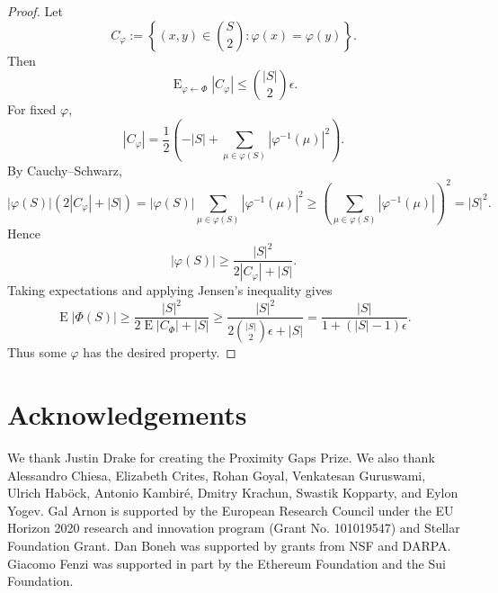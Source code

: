 \documentclass[11pt]{article}
\theoremstyle{plain}
\theoremstyle{definition}
\newcommand{\set}[1]{\left\{#1\right\}}
\newcommand{\abs}[1]{\left|#1\right|}
\DeclareMathOperator*{\E}{E}
\begin{document}
\begin{proof}
Let
\[
  C_\varphi:=\set{(x,y)\in\binom{S}{2}:\varphi(x)=\varphi(y)}.
\]
Then
\[
  \E_{\varphi\leftarrow\Phi}\abs{C_\varphi}\le \binom{\abs{S}}{2}\epsilon.
\]
For fixed $\varphi$,
\[
\abs{C_\varphi}=\frac12\left(-\abs{S}+\sum_{\mu\in\varphi(S)}\abs{\varphi^{-1}(\mu)}^2\right).
\]
By Cauchy--Schwarz,
\[
\abs{\varphi(S)}(2\abs{C_\varphi}+\abs{S})
=\abs{\varphi(S)}\sum_{\mu\in\varphi(S)}\abs{\varphi^{-1}(\mu)}^2
\ge\left(\sum_{\mu\in\varphi(S)}\abs{\varphi^{-1}(\mu)}\right)^2=\abs{S}^2.
\]
Hence
\[
  \abs{\varphi(S)}\ge \frac{\abs{S}^2}{2\abs{C_\varphi}+\abs{S}}.
\]
Taking expectations and applying Jensen's inequality gives
\[
\E\abs{\Phi(S)}\ge
\frac{\abs{S}^2}{2\E\abs{C_\Phi}+\abs{S}}
\ge
\frac{\abs{S}^2}{2\binom{\abs{S}}{2}\epsilon+\abs{S}}
=\frac{\abs{S}}{1+(\abs{S}-1)\epsilon}.
\]
Thus some $\varphi$ has the desired property.
\end{proof}

\section*{Acknowledgements}
We thank Justin Drake for creating the Proximity Gaps Prize. We also thank Alessandro Chiesa, Elizabeth Crites, Rohan Goyal, Venkatesan Guruswami, Ulrich Hab\"ock, Antonio Kambir\'e, Dmitry Krachun, Swastik Kopparty, and Eylon Yogev. Gal Arnon is supported by the European Research Council under the EU Horizon 2020 research and innovation program (Grant No. 101019547) and Stellar Foundation Grant. Dan Boneh was supported by grants from NSF and DARPA. Giacomo Fenzi was supported in part by the Ethereum Foundation and the Sui Foundation.
\end{document}
